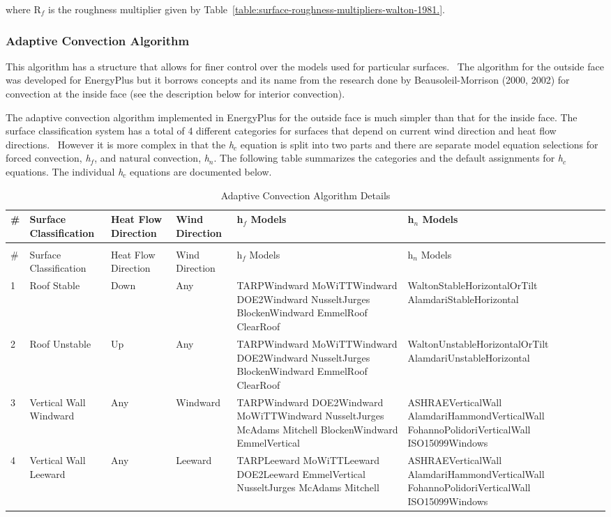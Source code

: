 where R\(_{f}\) is the roughness multiplier given by Table~\ref{table:surface-roughness-multipliers-walton-1981.}.

\subsubsection{Adaptive Convection Algorithm}\label{adaptive-convection-algorithm-000}

This algorithm has a structure that allows for finer control over the models used for particular surfaces.~ The algorithm for the outside face was developed for EnergyPlus but it borrows concepts and its name from the research done by Beausoleil-Morrison (2000, 2002) for convection at the inside face (see the description below for interior convection).

The adaptive convection algorithm implemented in EnergyPlus for the outside face is much simpler than that for the inside face. The surface classification system has a total of 4 different categories for surfaces that depend on current wind direction and heat flow directions.~ However it is more complex in that the \emph{h\(_{c}\)} equation is split into two parts and there are separate model equation selections for forced convection, \emph{h\(_{f}\)}, and natural convection, \emph{h\(_{n}\)}. The following table summarizes the categories and the default assignments for \emph{h\(_{c}\)} equations. The individual \emph{h\(_{c}\)} equations are documented below.

{\scriptsize
\begin{longtable}[c]{p{0.25in}p{0.75in}p{0.5in}p{0.5in}p{1.75in}p{1.75in}}

\caption{Adaptive Convection Algorithm Details \label{table:adaptive-convection-algorithm-details}} \tabularnewline
\toprule 
\# & Surface Classification & Heat Flow Direction & Wind Direction & h\(_f\) Models & h\(_n\) Models \tabularnewline
\midrule
\endfirsthead

\caption[]{Adaptive Convection Algorithm Details} \tabularnewline
\toprule 
\# & Surface Classification & Heat Flow Direction & Wind Direction & h\(_f\) Models & h\(_n\) Models \tabularnewline
\midrule
\endhead

1 & Roof Stable & Down & Any & TARPWindward MoWiTTWindward DOE2Windward NusseltJurges BlockenWindward EmmelRoof ClearRoof & WaltonStableHorizontalOrTilt AlamdariStableHorizontal \tabularnewline
2 & Roof Unstable & Up & Any & TARPWindward MoWiTTWindward DOE2Windward NusseltJurges BlockenWindward EmmelRoof ClearRoof & WaltonUnstableHorizontalOrTilt AlamdariUnstableHorizontal \tabularnewline
3 & Vertical Wall Windward & Any & Windward & TARPWindward DOE2Windward MoWiTTWindward NusseltJurges McAdams Mitchell BlockenWindward EmmelVertical & ASHRAEVerticalWall AlamdariHammondVerticalWall FohannoPolidoriVerticalWall ISO15099Windows \tabularnewline
4 & Vertical Wall Leeward & Any & Leeward & TARPLeeward MoWiTTLeeward DOE2Leeward EmmelVertical NusseltJurges McAdams Mitchell & ASHRAEVerticalWall AlamdariHammondVerticalWall FohannoPolidoriVerticalWall ISO15099Windows \tabularnewline
\bottomrule
\end{longtable}}

